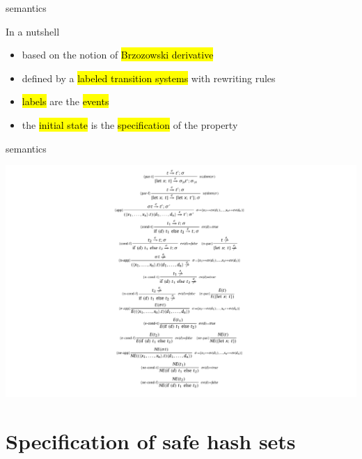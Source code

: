 \documentclass[10pt,usenames,dvipsnames]{beamer}
\begin{document}

\begin{frame}{\rml semantics}
  \begin{block}{In a nutshell}
    \begin{itemize}
    \item based on the notion of \hl{Brzozowski derivative} 
    \item defined by a \hl{labeled transition systems} with rewriting rules
    \item \hl{labels} are the \hl{events}
    \item the \hl{initial state} is the \hl{specification} of the property
    \end{itemize}
  \end{block}
\end{frame}


\begin{frame}{\rml semantics}
  \begin{center}
    \includegraphics[keepaspectratio,height=0.85\textheight]{images/semantics}
  \end{center}
\end{frame}


\section{Specification of safe hash sets}
\end{document}
